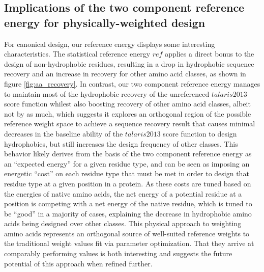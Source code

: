 \subsection{Implications of the two component reference energy for physically-weighted design}
For canonical design, our reference energy displays some interesting characteristics.
The statistical reference energy $ref$ applies a direct bonus to the design of non-hydrophobic residues, resulting in a drop in hydrophobic sequence recovery and an increase in recovery for other amino acid classes, as shown in figure \ref{fig:aa_recovery}.
In contrast, our two component reference energy manages to maintain most of the hydrophobic recovery of the unreferenced $talaris2013$ score function whilest also boosting recovery of other amino acid classes, albeit not by as much, which suggests it explores an orthogonal region of the possible reference weight space to achieve a sequence recovery result that causes minimal decreases in the baseline ability of the $talaris2013$ score function to design hydrophobics, but still increases the design frequency of other classes.
This behavior likely derives from the basis of the two component reference energy as an ``expected energy'' for a given residue type, and can be seen as imposing an energetic ``cost'' on each residue type that must be met in order to design that residue type at a given position in a protein.
As these costs are tuned based on the energies of native amino acids, the net energy of a potential residue at a position is competing with a net energy of the native residue, which is tuned to be ``good'' in a majority of cases, explaining the decrease in hydrophobic amino acids being designed over other classes.
This physical approach to weighting amino acids represents an orthogonal source of well-suited reference weights to the traditional weight values fit via parameter optimization.
That they arrive at comparably performing values is both interesting and suggests the future potential of this approach when refined further.

